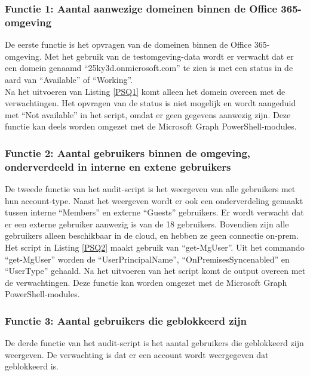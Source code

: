\subsubsection{Functie 1: Aantal aanwezige domeinen binnen de Office 365-omgeving}

De eerste functie is het opvragen van de domeinen binnen de Office 365-omgeving. Met het gebruik van de testomgeving-data wordt er verwacht dat er een domein genaamd “25ky3d.onmicrosoft.com” te zien is met een status in de aard van “Available” of “Working”. \\

Na het uitvoeren van Listing \ref{PSQ1} komt alleen het domein overeen met de verwachtingen. Het opvragen van de status is niet mogelijk en wordt aangeduid met “Not available” in het script, omdat er geen gegevens aanwezig zijn. Deze functie kan deels worden omgezet met de Microsoft Graph PowerShell-modules.

\subsubsection{Functie 2: Aantal gebruikers binnen de omgeving, onderverdeeld in interne en extene gebruikers}

De tweede functie van het audit-script is het weergeven van alle gebruikers met hun account-type. Naast het weergeven wordt er ook een onderverdeling gemaakt tussen interne “Members” en externe “Guests” gebruikers. Er wordt verwacht dat er een externe gebruiker aanwezig is van de 18 gebruikers. Bovendien zijn alle gebruikers alleen beschikbaar in de cloud, en hebben ze geen connectie \ac{on-prem}. \\

Het script in Listing \ref{PSQ2} maakt gebruik van “get-MgUser”. Uit het commando “get-MgUser” worden de “UserPrincipalName”, “OnPremisesSyncenabled” en “UserType” gehaald.  Na het uitvoeren van het script komt de output overeen met de verwachtingen. Deze functie kan worden omgezet met de Microsoft Graph PowerShell-modules. \\

\subsubsection{Functie 3: Aantal gebruikers die geblokkeerd zijn}

De derde functie van het audit-script is het aantal gebruikers die geblokkeerd zijn weergeven. De verwachting is dat er een account wordt weergegeven dat geblokkeerd is. \\

